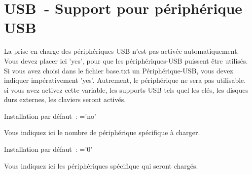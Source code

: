 
{
\section {USB~- Support pour périphérique USB}
}
\begin{description}


        La prise en charge des périphériques USB n'est pas activée automatiquement.
        Vous devez placer ici 'yes', pour que les périphériques-USB puissent être
        utilisés. Si vous avez choisi dans le fichier base.txt un Périphérique-USB,
        vous devez indiquer impérativement 'yes'. Autrement, le périphérique ne
        sera pas utilisable. si vous avez activez cette variable, les supports
        USB tels quel les clés, les disques durs externes, les claviers seront
        activés.

        Installation par défaut~: ='no'


        Vous indiquez ici le nombre de périphérique spécifique à charger.

        Installation par défaut~: ='0'


        Vous indiquez ici les périphériques spécifique qui seront chargés.


\end{description}
